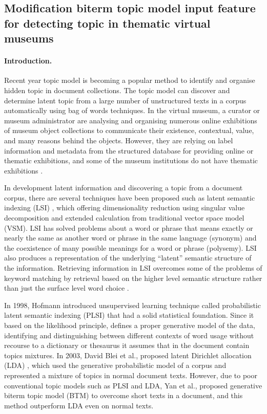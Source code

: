 \subsection{Modification biterm topic model input feature for detecting topic in thematic virtual museums}\label{subsec:ch4/sec2/sub5}

\paragraph{Introduction.} Recent year topic model is becoming a popular method to identify and organise hidden topic in document collections. The topic model can discover and determine latent topic from a large number of unstructured texts in a corpus automatically using bag of words techniques. In the virtual museum, a curator or museum administrator are analysing and organising numerous online exhibitions of museum object collections to communicate their existence, contextual, value, and many reasons behind the objects. However, they are relying on label information and metadata from the structured database for providing online or thematic exhibitions, and some of the museum institutions do not have thematic exhibitions \cite{Anggai,Foo,Champion,Palombini}.

In development latent information and discovering a topic from a document corpus, there are several techniques have been proposed such as latent semantic indexing (LSI) \cite{DeerwesterDumaisFurnas}, which offering dimensionality reduction using singular value decomposition and extended calculation from traditional vector space model (VSM). LSI has solved problems about a word or phrase that means exactly or nearly the same as another word or phrase in the same language (synonym) and the coexistence of many possible meanings for a word or phrase (polysemy). LSI also produces a representation of the underlying “latent” semantic structure of the information. Retrieving information in LSI overcomes some of the problems of keyword matching by retrieval based on the higher level semantic structure rather than just the surface level word choice \cite{Foltz}.

In 1998, Hofmann introduced unsupervised learning technique called probabilistic latent semantic indexing (PLSI) that had a solid statistical foundation. Since it based on the likelihood principle, defines a proper generative model of the data, identifying and distinguishing between different contexts of word usage without recourse to a dictionary or thesaurus \cite{Hofmann1999,Hofmann2001} it assumes that in the document contain topics mixtures. In 2003, David Blei et al., proposed latent Dirichlet allocation (LDA) \cite{BleiNgJordan}, which used the generative probabilistic model of a corpus and represented a mixture of topics in normal document texts. However, due to poor conventional topic models such as PLSI and LDA, Yan et al., proposed generative biterm topic model (BTM) \cite{YanGuoLan,ChengYanLan} to overcome short texts in a document, and this method outperform LDA even on normal texts.

